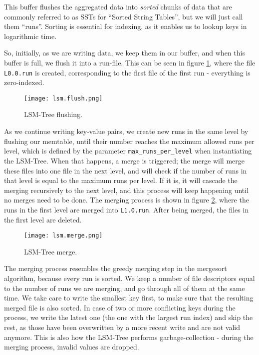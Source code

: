 This buffer flushes the aggregated data into \textit{sorted} chunks of data that are commonly referred to as SSTs for ``Sorted String Tables'', but we will just call them ``runs''.
Sorting is essential for indexing, as it enables us to lookup keys in logarithmic time.

So, initially, as we are writing data, we keep them in our buffer, and when this buffer is full, we flush it into a run-file. This can be seen in figure \ref{fig:lsm.flush}, where the file \verb"L0.0.run" is created, corresponding to the first file of the first run - everything is zero-indexed.

\begin{figure}[h]
    \centering
    \texttt{[image: lsm.flush.png]}
    \caption{LSM-Tree flushing.}
    \label{fig:lsm.flush}
\end{figure}

As we continue writing key-value pairs, we create new runs in the same level by flushing our memtable, until their number reaches the maximum allowed runs per level, which is defined by the parameter \verb"max_runs_per_level" when instantiating the LSM-Tree. When that happens, a merge is triggered; the merge will merge these files into one file in the next level, and will check if the number of runs in that level is equal to the maximum runs per level. If it is, it will cascade the merging recursively to the next level, and this process will keep happening until no merges need to be done. The merging process is shown in figure \ref{fig:lsm.merge}, where the runs in the first level are merged into \verb"L1.0.run". After being merged, the files in the first level are deleted. 

\begin{figure}[h]
    \centering
    \texttt{[image: lsm.merge.png]}
    \caption{LSM-Tree merge.}
    \label{fig:lsm.merge}
\end{figure}

The merging process resembles the greedy merging step in the mergesort algorithm, because every run is sorted. We keep a number of file descriptors equal to the number of runs we are merging, and go through all of them at the same time. We take care to write the smallest key first, to make sure that the resulting merged file is also sorted. In case of two or more conflicting keys during the process, we write the latest one (the one with the largest run index) and skip the rest, as those have been overwritten by a more recent write and are not valid anymore. This is also how the LSM-Tree performs garbage-collection - during the merging process, invalid values are dropped.

